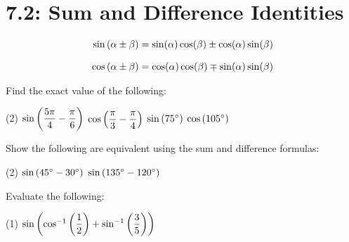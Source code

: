 \documentclass[../mathNotesPreamble]{subfiles}
\providecommand{\relscalefact}{1.4}
\begin{document}
\relscale{\relscalefact}
  \section{7.2: Sum and Difference Identities}


  \begin{defn*}
    \begin{align*}
      \sin{\left(\alpha\pm \beta\right)}&=\sin(\alpha)\cos(\beta)\pm\cos(\alpha)\sin(\beta)\\[0.5\baselineskip]
      \cos{\left(\alpha\pm \beta\right)}&=\cos(\alpha)\cos(\beta)\mp\sin(\alpha)\sin(\beta)
    \end{align*}
  \end{defn*}
  \begin{ex*}
    Find the exact value of the following:
    \begin{extasks}[after-item-skip=\stretch{1}](2)
      \task $\sin{\left(\dfrac{5\pi}{4}-\dfrac{\pi}{6}\right)}$
      \task $\cos{\left(\dfrac{\pi}{3}-\dfrac{\pi}{4}\right)}$
      \task $\sin{\left(75^\circ\right)}$
      \task $\cos{\left(105^\circ\right)}$
    \end{extasks}
  \end{ex*}
  \pagebreak

  \begin{ex*}
    Show the following are equivalent using the sum and difference formulas:
    \begin{extasks}[after-item-skip=\stretch{1}](2)
      \task $\sin{\left(45^\circ-30^\circ\right)}$
      \task $\sin{\left(135^\circ-120^\circ\right)}$
    \end{extasks}
  \end{ex*}

  \begin{ex*}
    Evaluate the following:
    \begin{extasks}[after-item-skip=\stretch{1}](1)
      \task $\sin{\left(\cos^{-1}{\left(\dfrac{1}{2}\right)}+\sin^{-1}{\left(\dfrac{3}{5}\right)}\right)}$
    \end{extasks}
  \end{ex*}
  \pagebreak
\end{document}
